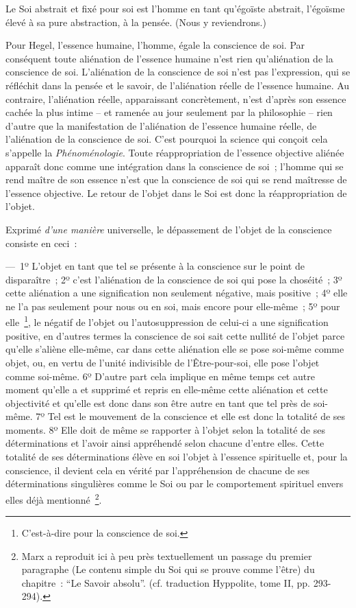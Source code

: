 \documentclass[french,twoside]{book} %
\begin{document}
Le Soi abstrait et fixé pour soi est l’homme en tant qu’égoïste abstrait, l’égoïsme élevé à sa pure abstraction, à la pensée. (Nous y reviendrons.)\par
Pour Hegel, l’essence humaine, l’homme, égale la conscience de soi. Par conséquent toute aliénation de l’essence humaine n’est rien qu’aliénation de la conscience de soi. L’aliénation de la conscience de soi n’est pas l’expression, qui se réfléchit dans la pensée et le savoir, de l’aliénation réelle de l’essence humaine. Au contraire, l’aliénation réelle, apparaissant concrètement, n’est d’après son essence cachée la plus intime – et ramenée au jour seulement par la philosophie – rien d’autre que la manifestation de l’aliénation de l’essence humaine réelle, de l’aliénation de la conscience de soi. C’est pourquoi la science qui conçoit cela s’appelle la \emph{Phénoménologie}. Toute réappropriation de l’essence objective aliénée apparaît donc comme une intégration dans la conscience de soi ; l’homme qui se rend maître de son essence n’est que la conscience de soi qui se rend maîtresse de l’essence objective. Le retour de l’objet dans le Soi est donc la réappropriation de l’objet.\par
Exprimé \emph{d’une manière} universelle, le dépassement de l’objet de la conscience consiste en ceci :\par
— 1º L’objet en tant que tel se présente à la conscience sur le point de disparaître ; 2º c’est l’aliénation de la conscience de soi qui pose la choséité ; 3º cette aliénation a une signification non seulement négative, mais positive ; 4º elle ne l’a pas seulement pour nous ou en soi, mais encore pour elle-même ; 5º pour elle \footnote{C’est-à-dire pour la conscience de soi.}, le négatif de l’objet ou l’autosuppression de celui-ci a une signification positive, en d’autres termes la conscience de soi sait cette nullité de l’objet parce qu’elle s’aliène elle-même, car dans cette aliénation elle se pose soi-même comme objet, ou, en vertu de l’unité indivisible de l’Être-pour-soi, elle pose l’objet comme soi-même. 6º D’autre part cela implique en même temps cet autre moment qu’elle a et supprimé et repris en elle-même cette aliénation et cette objectivité et qu’elle est donc dans son être autre en tant que tel près de soi-même. 7º Tel est le mouvement de la conscience et elle est donc la totalité de ses moments. 8º Elle doit de même se rapporter à l’objet selon la totalité de ses déterminations et l’avoir ainsi appréhendé selon chacune d’entre elles. Cette totalité de ses déterminations élève en soi l’objet à l’essence spirituelle et, pour la conscience, il devient cela en vérité par l’appréhension de chacune de ses déterminations singulières comme le Soi ou par le comportement spirituel envers elles déjà mentionné \footnote{Marx a reproduit ici à peu près textuellement un passage du premier paragraphe (Le contenu simple du Soi qui se prouve comme l’être) du chapitre : “Le Savoir absolu”. (cf. traduction Hyppolite, tome II, pp. 293-294).}.\par
\end{document}
